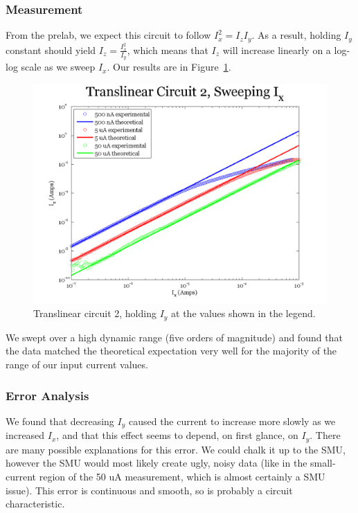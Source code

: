 \documentclass{article}
\begin{document}
\subsubsection*{Measurement}

From the prelab, we expect this circuit to follow $I_x ^2 = I_z I_y$.  As a result, holding $I_y$ constant should yield $I_z = \frac{I_x^2}{I_y}$, which means that $I_z$ will increase linearly on a log-log scale as we sweep $I_x$.  Our results are in Figure~\ref{fig:tl2sweepx}.

\begin{figure}[H]
\begin{center}
\includegraphics[scale=.75]{exp3_sweepx.png}
\caption{Translinear circuit 2, holding $I_y$ at the values shown in the legend.}
\label{fig:tl2sweepx}
\end{center}
\end{figure}

We swept over a high dynamic range (five orders of magnitude) and found that the data matched the theoretical expectation very well for the majority of the range of our input current values.  

\subsubsection*{Error Analysis}

We found that decreasing $I_y$ caused the current to increase more slowly as we increased $I_x$, and that this effect seems to depend, on first glance, on $I_y$. There are many possible explanations for this error.  We could chalk it up to the SMU, however the SMU would most likely create ugly, noisy data (like in the small-current region of the 50 uA measurement, which is almost certainly a SMU issue).  This error is continuous and smooth, so is probably a circuit characteristic. 
\end{document}
